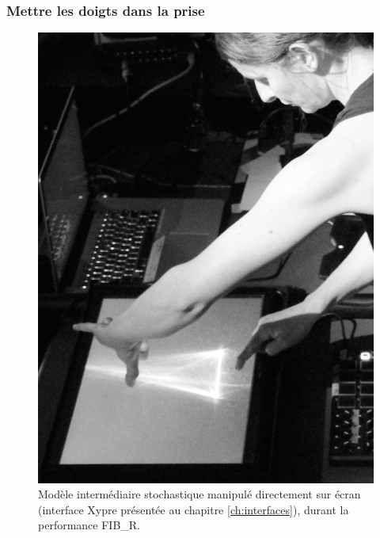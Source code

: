 \subsubsection{Mettre les doigts dans la prise}
\begin{figure}[!htbp]
	\captionsetup{format=plain}%
	\includegraphics[width=\textwidth]{gfx/06_visual_representation/Xypre-Live.jpg}
	\caption[Modèle intermédiaire stochastique manipulé sur écran]{Modèle intermédiaire stochastique manipulé directement sur écran (interface Xypre présentée au chapitre \ref{ch:interfaces}), durant la performance FIB\_R.}
	\label{fig:visual_representation:xypre-live}
\end{figure}

